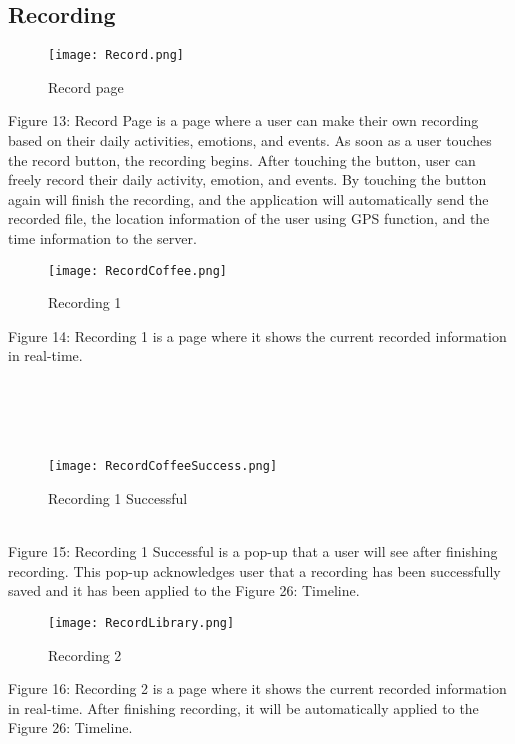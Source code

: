 \documentclass[conference]{IEEEtran}
\begin{document}
\subsection{Recording}
\begin{figure}[h]
\centerline{\texttt{[image: Record.png]}}
\caption{Record page}
\label{fig}
\end{figure}
Figure 13: Record Page is a page where a user can make their own recording based on their daily activities, emotions, and events. As soon as a user touches the record button, the recording begins. After touching the button, user can freely record their daily activity, emotion, and events. By touching the button again will finish the recording, and the application will automatically send the recorded file, the location information of the user using GPS function, and the time information to the server. 

\begin{figure}[h]
\centerline{\texttt{[image: RecordCoffee.png]}}
\caption{Recording 1}
\label{fig}
\end{figure}
Figure 14: Recording 1 is a page where it shows the current recorded information in real-time.
\\\\\\\\\\
\begin{figure}[h]
\centerline{\texttt{[image: RecordCoffeeSuccess.png]}}
\caption{Recording 1 Successful}
\label{fig}
\end{figure}
\\
\indent Figure 15: Recording 1 Successful is a pop-up that a user will see after finishing recording. This pop-up acknowledges user that a recording has been successfully saved and it has been applied to the Figure 26: Timeline.

\begin{figure}[h]
\centerline{\texttt{[image: RecordLibrary.png]}}
\caption{Recording 2}
\label{fig}
\end{figure}
Figure 16: Recording 2 is a page where it shows the current recorded information in real-time. After finishing recording, it will be automatically applied to the Figure 26: Timeline.
\end{document}
